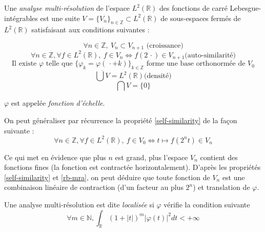 	\begin{mydef}
		Une \textit{analyse multi-résolution} de l'espace $L^2(\mathbb{R})$ des fonctions de carré Lebesgue-intégrables est une suite $V = \{V_n\}_{n \in \mathbb{Z}} \subset L^2(\mathbb{R})$ de sous-espaces fermés de $L^2(\mathbb{R})$ satisfaisant aux conditions suivantes :

		\begin{equation}
			\label{growth}
			\forall n \in \mathbb{Z}, ~ V_{n} \subset V_{n+1} \text{ (croissance)}
		\end{equation}
		\begin{equation}
			\label{self-similarity}
			\forall n \in \mathbb{Z}, \forall f \in L^2(\mathbb{R}), ~ f \in V_n \Longleftrightarrow f (2 \, \cdot ) \in V_{n+1} \text{(auto-similarité)}
		\end{equation}
		\begin{equation}
			\label{rb-mra}
			\text{Il existe $\varphi$ telle que $\{\varphi_k = \varphi(\, \cdot + k)\}_{k \in \mathbb{Z}}$ forme une base orthonormée de $V_0$}
		\end{equation}
		\begin{equation}
			\label{density}
			\overline{\bigcup V} = L^2(\mathbb{R}) \text{(densité)}
		\end{equation}
		\begin{equation}
			\label{inter}
			\bigcap V = \{0\}
		\end{equation}
		
		$\varphi$ est appelée \textit{fonction d'échelle}.
	\end{mydef}
	
	On peut généraliser par récurrence la propriété \ref{self-similarity} de la façon suivante :
	\begin{equation}
		\forall n \in \mathbb{Z}, \forall f \in L^2(\mathbb{R}), ~ f \in V_0 \Longleftrightarrow t \mapsto f \left(2^n t\right) \in V_{n}
	\end{equation}

	Ce qui met en évidence que plus $n$ est grand, plus l'espace $V_n$ contient des fonctions fines (la fonction est contractée horizontalement). D'après les propriétés \ref{self-similarity} et \ref{rb-mra}, on peut déduire que toute fonction de $V_n$ est une combinaison linéaire de contraction (d'un facteur au plus $2^n$) et translation de $\varphi$.

	\begin{mydef}
		Une analyse multi-résolution est dite \textit{localisée} si $\varphi$ vérifie la condition suivante
		\begin{equation}
			\label{localized}
			\forall m \in \mathbb{N}, \int_\mathbb{R} (1+|t|)^m |\varphi(t)|^2 dt < + \infty
		\end{equation}
	\end{mydef}
	
